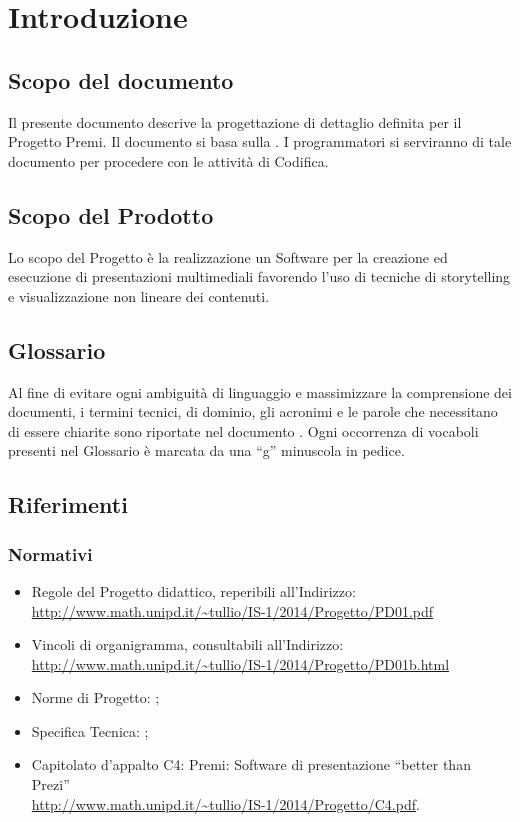 \section{Introduzione}
\subsection{Scopo del documento}
Il presente documento descrive la progettazione di dettaglio definita per il Progetto Premi. Il documento si basa sulla \href{run:../../Esterni/\fSpecificaTecnica}{\fEscapeSpecificaTecnica}. I programmatori si serviranno di tale documento per procedere con le attività di Codifica.
\subsection{Scopo del Prodotto}
Lo scopo del Progetto è la realizzazione un Software per la creazione ed esecuzione di presentazioni multimediali favorendo l’uso di tecniche di storytelling e visualizzazione non lineare dei contenuti.
\subsection{Glossario}
Al fine di evitare ogni ambiguità di linguaggio e massimizzare la comprensione dei documenti, i termini tecnici, di dominio, gli acronimi e le parole che necessitano di essere chiarite sono riportate nel documento \href{run:../../Esterni/\fGlossario}{\fEscapeGlossario}. Ogni occorrenza di vocaboli presenti nel Glossario è marcata da una “g” minuscola in pedice.
\subsection{Riferimenti}
\subsubsection{Normativi}

\begin{itemize}
\item Regole del Progetto didattico, reperibili all'Indirizzo:\\ \url{http://www.math.unipd.it/~tullio/IS-1/2014/Progetto/PD01.pdf}
\item Vincoli di organigramma, consultabili all’Indirizzo:\\ \url{http://www.math.unipd.it/~tullio/IS-1/2014/Progetto/PD01b.html}
\item Norme di Progetto: \href{run:../../Interni/\fNormeDiProgetto}{\fEscapeNormeDiProgetto};
\item Specifica Tecnica: \href{run:../../Esterni/\fSpecificaTecnica}{\fEscapeSpecificaTecnica};
\item Capitolato d’appalto C4: Premi: Software di presentazione “better than Prezi” \\
\url{http://www.math.unipd.it/~tullio/IS-1/2014/Progetto/C4.pdf}.
\end{itemize}

